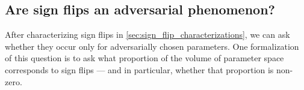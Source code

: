 %
%    
%
%
%

\subsection{Are sign flips an adversarial phenomenon?}
\label{sec:sign_flip_fraction}

After characterizing sign flips in \cref{sec:sign_flip_characterizations}, we can ask whether they occur only for adversarially chosen parameters.
One formalization of this question is to ask what proportion of the volume of parameter space corresponds to sign flips --- and in particular, whether that proportion is non-zero.

